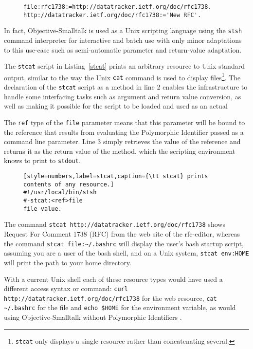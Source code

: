 \documentclass[preprint]{sigplanconf}
\begin{document}
\begin{figure}[htbp]
\begin{lstlisting}[style=numbers,label=download-to-file,caption=Downloading an RFC to a file.]
file:rfc1738:=http://datatracker.ietf.org/doc/rfc1738.
http://datatracker.ietf.org/doc/rfc1738:='New RFC'.
\end{lstlisting}
\end{figure}

In fact,  Objective-Smalltalk is used as a Unix scripting language using the {\tt stsh} command
interpreter for interactive and batch use with only minor adaptations to this use-case such
as semi-automatic parameter and return-value adaptation.


The {\tt stcat} script in Listing~\ref{stcat} prints an arbitrary resource to Unix standard output, 
similar to the way the Unix {\tt cat} command is used to display files\footnote{{\tt stcat} only 
displays a single resource rather than concatenating several.}.
The declaration of the {\tt stcat} script as a method in line 2 enables the infrastructure to 
handle some interfacing tasks such as argument and return value conversion, as well
as making it possible for the script to be loaded and used as an actual 

The {\tt ref} type of the {\tt file} parameter means that this parameter will be bound to the
reference that results from evaluating the Polymorphic Identifier passed as a command
line parameter.    Line 3 simply retrieves the value of the reference and returns it as
the return value of the method, which the scripting environment knows to print to {\tt stdout}.


\begin{figure}[htbp]
\begin{lstlisting}[style=numbers,label=stcat,caption={\tt stcat} prints contents of any resource.]
#!/usr/local/bin/stsh
#-stcat:<ref>file
file value.
\end{lstlisting}
\end{figure}


The command  {\tt stcat http://datatracker.ietf.org/doc/rfc1738} shows \break \mbox{Request}
For Comment 1738 (RFC) from the web site of the rfc-editor, whereas 
the command {\tt stcat file:\~\//.bashrc} will display the user's bash startup script, assuming you are a user of the
bash shell, and on a Unix system, {\tt stcat env:HOME} will print the path to 
your home directory.
\fussy

With a current Unix shell each of these resource types would have used a different
access syntax or command:   {\tt curl http://datatracker.ietf.org/doc/rfc1738} for the
web resource, {\tt cat  \~\//.bashrc} for the file and {\tt echo \$HOME} for the environment
variable, as would using Objective-Smalltalk without Polymorphic Identifiers .
\end{document}
